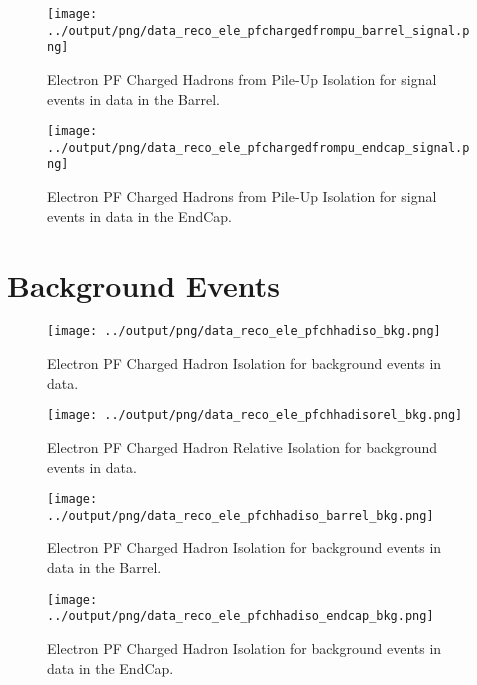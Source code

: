 \documentclass[11pt]{book}
\begin{document}
\begin{figure}[htb]
\centering
\texttt{[image: ../output/png/data\_reco\_ele\_pfchargedfrompu\_barrel\_signal.png]}
\caption{Electron PF Charged Hadrons from Pile-Up Isolation for signal events in data in the Barrel.}
\label{fig:data_ele_pfchargedfrompu_barrel_signal}
\end{figure}

\begin{figure}[htb]
\centering
\texttt{[image: ../output/png/data\_reco\_ele\_pfchargedfrompu\_endcap\_signal.png]}
\caption{Electron PF Charged Hadrons from Pile-Up Isolation for signal events in data in the EndCap.}
\label{fig:data_ele_pfchargedfrompu_endcap_signal}
\end{figure}


\clearpage

\section{Background Events}

\begin{figure}[htb]
\centering
\texttt{[image: ../output/png/data\_reco\_ele\_pfchhadiso\_bkg.png]}
\caption{Electron PF Charged Hadron Isolation for background events in data.}
\label{fig:data_ele_pfchhadiso_bkg}
\end{figure}

\begin{figure}[htb]
\centering
\texttt{[image: ../output/png/data\_reco\_ele\_pfchhadisorel\_bkg.png]}
\caption{Electron PF Charged Hadron Relative Isolation for background events in data.}
\label{fig:data_ele_pfchhadisorel_bkg}
\end{figure}

\begin{figure}[htb]
\centering
\texttt{[image: ../output/png/data\_reco\_ele\_pfchhadiso\_barrel\_bkg.png]}
\caption{Electron PF Charged Hadron Isolation for background events in data in the Barrel.}
\label{fig:data_ele_pfchhadiso_barrel_bkg}
\end{figure}

\begin{figure}[htb]
\centering
\texttt{[image: ../output/png/data\_reco\_ele\_pfchhadiso\_endcap\_bkg.png]}
\caption{Electron PF Charged Hadron Isolation for background events in data in the EndCap.}
\label{fig:data_ele_pfchhadiso_endcap_bkg}
\end{figure}
\end{document}
